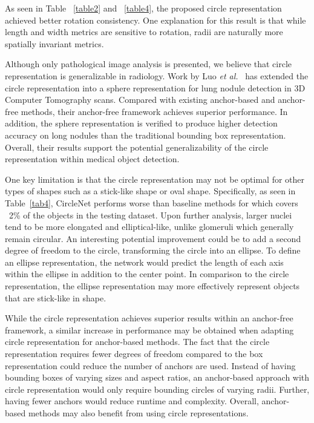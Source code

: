 \documentclass[journal]{IEEEtran}
\newcommand{\Tab}{Table}
\newcommand{\etal}{\textit{et al.}}
\begin{document}
As seen in Table ~\ref{table2} and ~\ref{table4}, the proposed circle representation achieved better rotation consistency. One explanation for this result is that while length and width metrics are sensitive to rotation, radii are naturally more spatially invariant metrics.

Although only pathological image analysis is presented, we believe that circle representation is generalizable in radiology. Work by Luo \etal~\cite{luo2021scpmnet} has extended the circle representation into a sphere representation for lung nodule detection in 3D Computer Tomography scans. Compared with existing anchor-based and anchor-free methods, their anchor-free framework achieves superior performance. In addition, the sphere representation is verified to produce higher detection accuracy on long nodules than the traditional bounding box representation. Overall, their results support the potential generalizability of the circle representation within medical object detection.

One key limitation is that the circle representation may not be optimal for other types of shapes such as a stick-like shape or oval shape. Specifically, as seen in \Tab~\ref{tab4}, CircleNet performs worse than baseline methods for  which covers ~2\% of the objects in the testing dataset. Upon further analysis, larger nuclei tend to be more elongated and elliptical-like, unlike glomeruli which generally remain circular. An interesting potential improvement could be to add a second degree of freedom to the circle, transforming the circle into an ellipse. To define an ellipse representation, the network would predict the length of each axis within the ellipse in addition to the center point. In comparison to the circle representation, the ellipse representation may more effectively represent objects that are stick-like in shape.

While the circle representation achieves superior results within an anchor-free framework, a similar increase in performance may be obtained when adapting circle representation for anchor-based methods. The fact that the circle representation requires fewer degrees of freedom compared to the box representation could reduce the number of anchors are used. Instead of having bounding boxes of varying sizes and aspect ratios, an anchor-based approach with circle representation would only require bounding circles of varying radii. Further, having fewer anchors would reduce runtime and complexity. Overall, anchor-based methods may also benefit from using circle representations.
\end{document}
